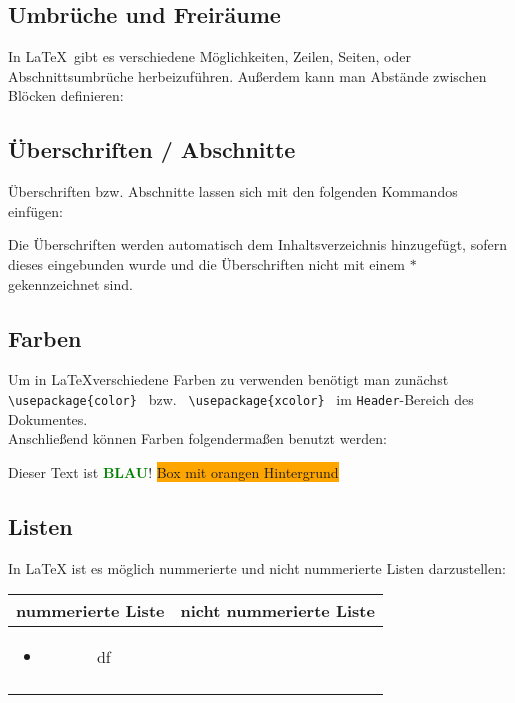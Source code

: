 \subsection{Umbrüche und Freiräume}
In \LaTeX \ gibt es verschiedene Möglichkeiten, Zeilen, Seiten, oder 
Abschnittsumbrüche herbeizuführen. Außerdem kann man Abstände zwischen Blöcken 
definieren:


\subsection{Überschriften / Abschnitte}
Überschriften bzw. Abschnitte lassen sich mit den folgenden Kommandos einfügen:

Die Überschriften werden automatisch dem Inhaltsverzeichnis hinzugefügt, sofern 
dieses eingebunden wurde und die Überschriften nicht mit einem $*$ 
gekennzeichnet sind.
\subsection{Farben}

Um in \LaTeX verschiedene Farben zu verwenden benötigt man zunächst
\lstinline$ \usepackage{color} $ bzw. \lstinline$ \usepackage{xcolor} $ im 
\texttt{Header}-Bereich des Dokumentes.
\\
Anschließend können Farben folgendermaßen benutzt werden:
\begin{flushleft}
\pagecolor{white}   %
\color{blue}         %
Dieser Text ist
\textcolor{green}{\textbf{BLAU}}!    %
\colorbox{orange}{Box mit orangen Hintergrund}   %
\color{schrift}
\\
\end{flushleft}



\subsection{Listen}
In LaTeX ist es möglich nummerierte und nicht nummerierte Listen darzustellen:

\begin{table}[h]
\begin{tabular}{c|c}
nummerierte Liste & nicht nummerierte Liste \\ 
\hline { 
\begin{itemize}
\item df
\end{itemize}	
}	&  \\ 
	
\hline 
	&  \\ 
	
\end{tabular} 
\end{table}